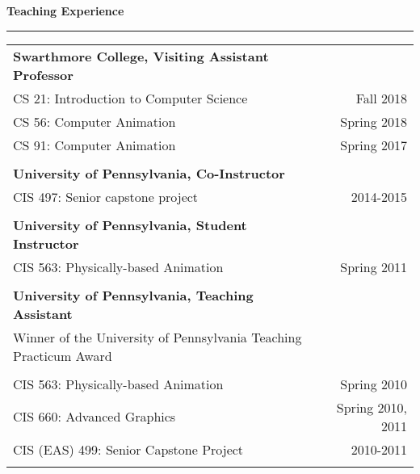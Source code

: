 \needspace{6em}
{\large {\bf Teaching Experience}}
\vspace{0.1cm}
\hrule
\begin{tabular*}{7.1in}{@{}l@{\extracolsep\fill}r}

{\bf Swarthmore College, Visiting Assistant Professor} & \\
CS 21: Introduction to Computer Science & Fall 2018\\
CS 56: Computer Animation & Spring 2018\\
CS 91: Computer Animation & Spring 2017\\
\phantom{yommomma} & \phantom{2002}\\

{\bf University of Pennsylvania, Co-Instructor} & \\
CIS 497: Senior capstone project & 2014-2015\\
\phantom{yommomma} & \phantom{2002}\\

{\bf University of Pennsylvania, Student Instructor} & \\
CIS 563: Physically-based Animation & Spring 2011\\
\phantom{yommomma} & \phantom{2002}\\
{\bf University of Pennsylvania, Teaching Assistant} & \\
Winner of the University of Pennsylvania Teaching Practicum Award & \\
\phantom{yommomma} & \phantom{2002}\\
CIS 563: Physically-based Animation & Spring 2010\\
CIS 660: Advanced Graphics & Spring 2010, 2011\\
CIS (EAS) 499: Senior Capstone Project  & 2010-2011\\
\phantom{yommomma} & \phantom{2002}\\
\end{tabular*}


